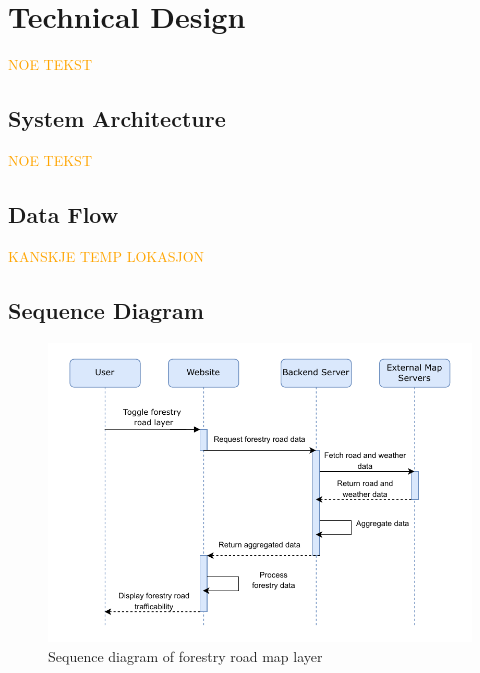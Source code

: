 \chapter{Technical Design}\label{chap:technicaldesign}

\textcolor{orange}{NOE TEKST}

\section{System Architecture}\label{sec:systemarchitecture}

\textcolor{orange}{NOE TEKST}

\section{Data Flow} %

\textcolor{orange}{KANSKJE TEMP LOKASJON}

\section{Sequence Diagram}
\begin{figure}[h]
    \centering
    \includegraphics[width=1\linewidth]{figures/sequence_diagram.pdf}
    \caption{Sequence diagram of forestry road map layer}
    \label{fig:sequence_diagram}
\end{figure}

